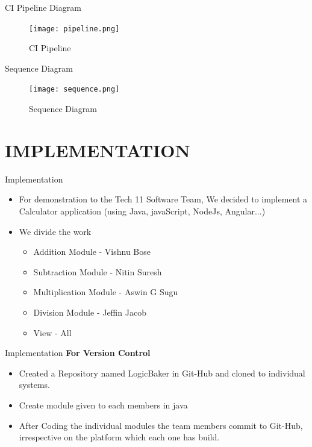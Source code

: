 \documentclass{beamer}
\begin{document}
\begin{frame}{CI Pipeline Diagram}

\begin{figure}[h]
\begin{center}
\texttt{[image: pipeline.png]}
\caption{CI Pipeline}
\end{center}
\end{figure}
\end{frame}

\begin{frame}{Sequence Diagram}

\begin{figure}[h]
\begin{center}
\texttt{[image: sequence.png]}
\caption{Sequence Diagram}
\end{center}
\end{figure}
\end{frame}

\section{IMPLEMENTATION}

\begin{frame}{Implementation}

\begin{itemize}
	\item For demonstration to the Tech 11 Software Team, We decided to implement a Calculator application (using Java, javaScript, NodeJs, Angular...)
	\item We divide the work
	\\
	\begin{itemize}
		\item Addition Module - Vishnu Bose
		\item Subtraction Module - Nitin Suresh
		\item Multiplication Module - Aswin G Sugu
		 \item Division Module - Jeffin Jacob
		 \item View - All
	\end{itemize}
\end{itemize}	
\end{frame}



\begin{frame}{Implementation}
	\textbf{For Version Control}
	\begin{itemize}
		\item Created a Repository named LogicBaker in Git-Hub and cloned to individual systems.
		\item Create module given to each members in java
		\item After Coding the individual modules the team members commit to Git-Hub, irrespective on the platform which each one has build.
		
		 
	
	\end{itemize}	
\end{frame}
\end{document}
